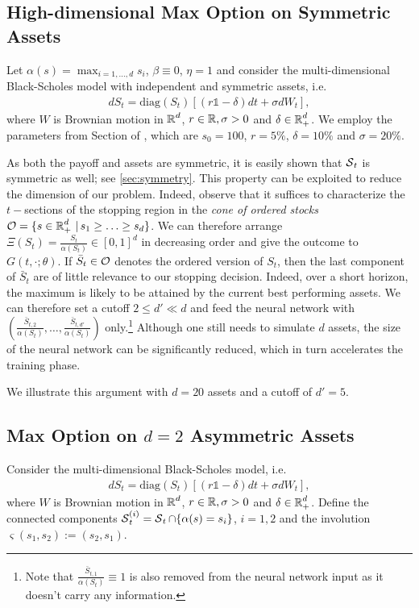 \subsection{High-dimensional Max Option on Symmetric Assets}\label{sec:maxCallSym}
Let $\alpha(s) = \max_{i=1,...,d}s_i$, $\beta\equiv 0$, $\eta=1$ and consider the multi-dimensional Black-Scholes model with independent and symmetric assets, i.e. 
\begin{align}\label{eq:BSAsym}
    d S_t = \text{diag}(S_t) \left[ (r\mathds{1} - \delta)dt + \sigma dW_t\right],
\end{align}
where $W$ is Brownian motion in $\operatorname{\mathbb{R}}^d$, $r \in \operatorname{\mathbb{R}} ,\sigma > 0$ and $\delta \in \operatorname{\mathbb{R}}_+^d$. We employ the parameters from Section of \cite{Becker2}, which are $s_0 =100 $, $r=5\%$, $\delta =10\%$ and $\sigma = 20 \%$. 

As both the payoff and assets are symmetric, it is easily shown that  $\operatorname{\mathcal{S}}_t$ is symmetric as well; see \cref{sec:symmetry}. This property can be exploited to reduce the dimension of our problem. Indeed, observe that it suffices to characterize the $t-$sections of the stopping region in the \textit{cone of ordered stocks}  
 $\operatorname{\mathcal{O}} = \{s\in \operatorname{\mathbb{R}}_+^d \,|\, s_1 \geq \ldots \geq s_d\}$. We can therefore arrange $\Xi(S_t) = \frac{S_t}{\alpha(S_t)}\in [0,1]^d$ in decreasing order and give the outcome to $G(t,\cdot; \theta)$. If $\bar{S}_t \in \operatorname{\mathcal{O}}$ denotes the ordered version of $S_t$, then the last component of $\bar{S}_t$ are of little relevance to our stopping decision. 
 Indeed, over a short horizon, the maximum is  likely to be attained by the current best performing assets. %
 We can therefore set a cutoff $2 \le d' \ll d$ and feed the neural network with $(\frac{\bar{S}_{t,2}}{\alpha(S_t)},\ldots,\frac{\bar{S}_{t,d'}}{\alpha(S_t)})$ only.\footnote{Note that $\frac{\bar{S}_{t,1}}{\alpha(S_t)} \equiv 1$ is also removed from the neural network input as it doesn't carry any information.} Although one still needs to simulate $d$ assets, the size of the neural network can be significantly reduced, which in turn accelerates the training phase.  
 
 We illustrate this argument with $d=20$ assets and a cutoff of $d'=5$. 

\subsection{Max Option on $d=2$ Asymmetric Assets}\label{sec:maxCallAsym}
Consider the multi-dimensional Black-Scholes model, i.e. 
\begin{align}\label{eq:BSAsym}
    d S_t = \text{diag}(S_t) \left[ (r\mathds{1} - \delta)dt + \sigma dW_t\right],
\end{align}
where $W$ is Brownian motion in $\operatorname{\mathbb{R}}^d$, $r \in \operatorname{\mathbb{R}} ,\sigma > 0$ and $\delta \in \operatorname{\mathbb{R}}_+^d$. 
Define the connected components $\operatorname{\mathcal{S}}^{(i)}_t = \operatorname{\mathcal{S}}_t \cap \{\alpha(s) = s_i\}$, $i=1,2$ and the involution   $\varsigma(s_1,s_2) := (s_2,s_1)$.  

